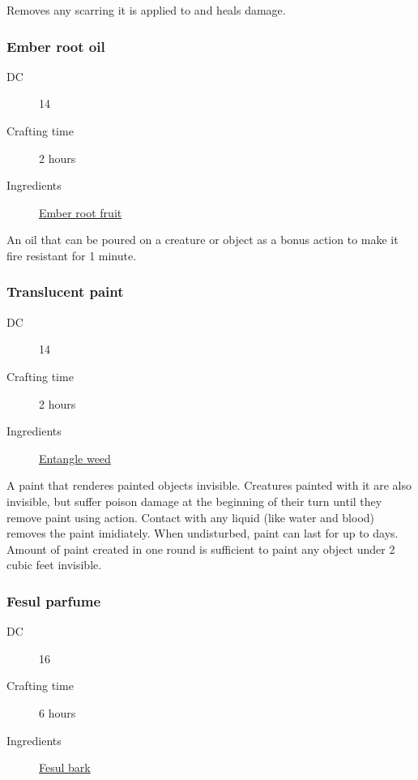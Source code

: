 Removes any scarring it is applied to and heals  damage.

\subsubsection{Ember root oil}
\label{Ember root oil}

\begin{description}
\item [DC] 14
\item [Crafting time] 2 hours
\item [Ingredients] \hyperref[Ember root]{Ember root fruit}
\end{description}

An oil that can be poured on a creature or object as a bonus action to make it fire resistant for 1 minute.

\subsubsection{Translucent paint}
\label{Translucent paint}

\begin{description}
\item [DC] 14
\item [Crafting time] 2 hours
\item [Ingredients] \hyperref[Entangle Weed]{Entangle weed}
\end{description}

A paint that renderes painted objects invisible. Creatures painted with it are also invisible, 
but suffer  poison damage at the beginning of their turn until they remove paint using action. 
Contact with any liquid (like water and blood) removes the paint imidiately. 
When undisturbed, paint can last for up to  days. 
Amount of paint created in one round is sufficient to paint any object under 2 cubic feet invisible.

\subsubsection{Fesul parfume}
\label{Fesul parfume}

\begin{description}
\item [DC] 16
\item [Crafting time] 6 hours
\item [Ingredients] \hyperref[Fesul]{Fesul bark}
\end{description}

